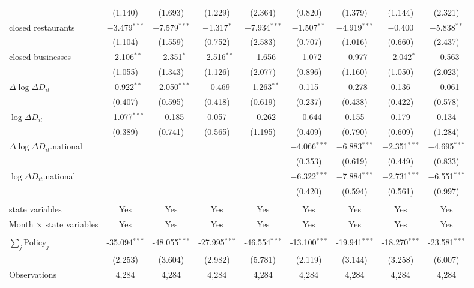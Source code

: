 \documentclass{beamer}
\begin{document}
\begin{frame}
\begin{table}[!htbp]
\begin{minipage}{\linewidth}
{\begin{tabular}{@{\extracolsep{1pt}}lcccccccc}
  & (1.140) & (1.693) & (1.229) & (2.364) & (0.820) & (1.379) & (1.144) & (2.321) \\ 
  closed restaurants & $-$3.479$^{***}$ & $-$7.579$^{***}$ & $-$1.317$^{*}$ & $-$7.934$^{***}$ & $-$1.507$^{**}$ & $-$4.919$^{***}$ & $-$0.400 & $-$5.838$^{**}$ \\ 
  & (1.104) & (1.559) & (0.752) & (2.583) & (0.707) & (1.016) & (0.660) & (2.437) \\ 
  closed businesses & $-$2.106$^{**}$ & $-$2.351$^{*}$ & $-$2.516$^{**}$ & $-$1.656 & $-$1.072 & $-$0.977 & $-$2.042$^{*}$ & $-$0.563 \\ 
  & (1.055) & (1.343) & (1.126) & (2.077) & (0.896) & (1.160) & (1.050) & (2.023) \\ 
  $\Delta \log \Delta D_{it}$ & $-$0.922$^{**}$ & $-$2.050$^{***}$ & $-$0.469 & $-$1.263$^{**}$ & 0.115 & $-$0.278 & 0.136 & $-$0.061 \\ 
  & (0.407) & (0.595) & (0.418) & (0.619) & (0.237) & (0.438) & (0.422) & (0.578) \\ 
  $\log \Delta D_{it}$ & $-$1.077$^{***}$ & $-$0.185 & 0.057 & $-$0.262 & $-$0.644 & 0.155 & 0.179 & 0.134 \\ 
  & (0.389) & (0.741) & (0.565) & (1.195) & (0.409) & (0.790) & (0.609) & (1.284) \\ 
  $\Delta \log \Delta D_{it}$.national &  &  &  &  & $-$4.066$^{***}$ & $-$6.883$^{***}$ & $-$2.351$^{***}$ & $-$4.695$^{***}$ \\ 
  &  &  &  &  & (0.353) & (0.619) & (0.449) & (0.833) \\ 
  $\log \Delta D_{it}$.national &  &  &  &  & $-$6.322$^{***}$ & $-$7.884$^{***}$ & $-$2.731$^{***}$ & $-$6.551$^{***}$ \\ 
  &  &  &  &  & (0.420) & (0.594) & (0.561) & (0.997) \\ 
 \hline \\[-1.8ex] 
state variables & Yes & Yes & Yes & Yes & Yes & Yes & Yes & Yes \\ 
Month $\times$ state variables & Yes & Yes & Yes & Yes & Yes & Yes & Yes & Yes \\ 
\hline \\[-1.8ex] 
$\sum_j \mathrm{Policy}_j$ & -35.094$^{***}$ & -48.055$^{***}$ & -27.995$^{***}$ & -46.554$^{***}$ & -13.100$^{***}$ & -19.941$^{***}$ & -18.270$^{***}$ & -23.581$^{***}$ \\ 
 & (2.253) & (3.604) & (2.982) & (5.781) & (2.119) & (3.144) & (3.258) & (6.007) \\ 
Observations & 4,284 & 4,284 & 4,284 & 4,284 & 4,284 & 4,284 & 4,284 & 4,284 \\ 

\end{tabular}}
\end{minipage}
\end{table}
\end{frame}
\end{document}
